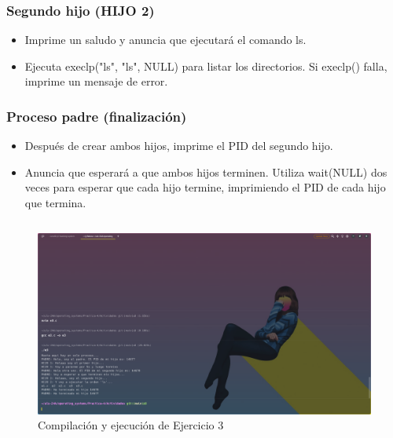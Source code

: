 \documentclass{article}
\newenvironment{code}{\captionsetup{type=listing}}{}
\begin{document}
\subsubsection*{Segundo hijo (HIJO 2)}
    \begin{itemize}
        \item Imprime un saludo y anuncia que ejecutará el comando ls.
        \item Ejecuta execlp("ls", "ls", NULL) para listar los 
		directorios. Si execlp() falla, imprime un mensaje de error.
	\end{itemize}
\subsubsection*{Proceso padre (finalización)}
    \begin{itemize}
        \item Después de crear ambos hijos, imprime el PID del segundo 
		hijo.
        \item Anuncia que esperará a que ambos hijos terminen. Utiliza 
		wait(NULL) dos veces para esperar que cada hijo termine, 
		imprimiendo el PID de cada hijo que termina.
	\end{itemize}
\begin{code}
	\inputminted{c}{../Ejercicios/e3.c}
\end{code}
\begin{figure}[h]
	\caption{Compilación y ejecución de Ejercicio 3}
	\centering
	\includegraphics[scale=0.3,trim={0 0 20cm 18cm},clip]{ejer-e3.png}
\end{figure}
\end{document}
